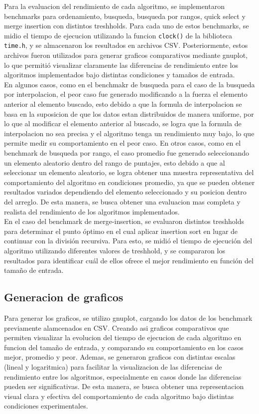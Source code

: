 Para la evaluacion del rendimiento de cada algoritmo, se implementaron benchmarks para ordenamiento, busqueda, busqueda por rangos, quick select y merge insertion con distintos treshholds. Para cada uno de estos benchmarks, se midio el tiempo de ejecucion utilizando la funcion \texttt{clock()} de la biblioteca \texttt{time.h}, y se almacenaron los resultados en archivos CSV.  Posteriormente, estos archivos fueron utilizados para generar graficos comparativos mediante gnuplot, lo que permitió visualizar claramente las diferencias de rendimiento entre los algoritmos implementados bajo distintas condiciones y tamaños de entrada.
\\
En algunos casos, como en el benchmakr de busqueda para el caso de la busqueda por interpolacion, el peor caso fue generado modificando a la fuerza el elemento anterior al elemento buscado, esto debido a que la formula de interpolacion se basa en la suposicion de que los datos estan distribuidos de manera uniforme, por lo que al modificar el elemento anterior al buscado, se logra que la formula de interpolacion no sea precisa y el algoritmo tenga un rendimiento muy bajo, lo que permite medir su comportamiento en el peor caso.  En otros casos, como en el benchmark de busqueda por rango, el caso promedio fue generado seleccionando un elemento aleatorio dentro del rango de puntajes, esto debido a que al seleccionar un elemento aleatorio, se logra obtener una muestra representativa del comportamiento del algoritmo en condiciones promedio, ya que se pueden obtener resultados variados dependiendo del elemento seleccionado y su posicion dentro del arreglo.  De esta manera, se busca obtener una evaluacion mas completa y realista del rendimiento de los algoritmos implementados. \\
En el caso del benchmark de merge-insertion, se evaluaron distintos treshholds para determinar el punto óptimo en el cual aplicar insertion sort en lugar de continuar con la división recursiva. Para esto, se midió el tiempo de ejecución del algoritmo utilizando diferentes valores de treshhold, y se compararon los resultados para identificar cuál de ellos ofrece el mejor rendimiento en función del tamaño de entrada.

\subsection{Generacion de graficos}
Para generar los graficos, se utilizo gnuplot, cargando los datos de los benchmark previamente alamcenados en CSV. Creando asi graficos comparativos que permiten visualizar la evolucion del tiempo de ejecucion de cada algoritmo en funcion del tamaño de entrada, y comparando su comportamiento en los casos mejor, promedio y peor.  Ademas, se generaron graficos con distintas escalas (lineal y logaritmica) para facilitar la visualizacion de las diferencias de rendimiento entre los algoritmos, especialmente en casos donde las diferencias pueden ser significativas.  De esta manera, se busca obtener una representacion visual clara y efectiva del comportamiento de cada algoritmo bajo distintas condiciones experimentales.


